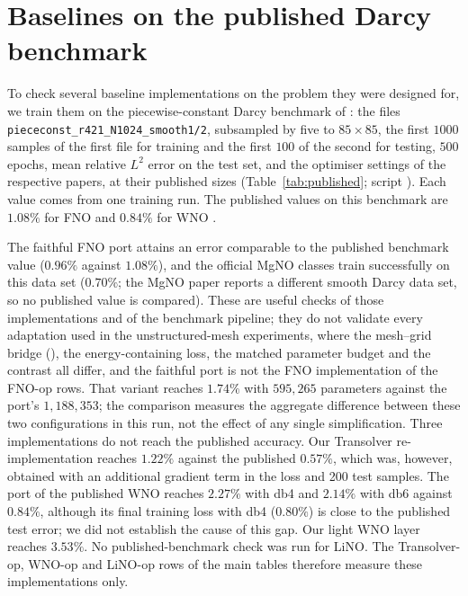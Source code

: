 \section{Baselines on the published Darcy benchmark}\label{app:published}
To check several baseline implementations on the problem they were designed for, we train them on the piecewise-constant
Darcy benchmark of \cite{li2021fno}: the files \texttt{piececonst\_r421\_N1024\_smooth1/2}, subsampled by five to
$85\times85$, the first $1000$ samples of the first file for training and the first $100$ of the second for testing, $500$
epochs, mean relative $L^2$ error on the test set, and the optimiser settings of the respective papers, at their published
sizes (Table~\ref{tab:published}; script ). Each value comes from one training run. The
published values on this benchmark are $1.08\%$ for FNO and $0.84\%$ for WNO \cite{tripura2023wno}.

The faithful FNO port attains an error comparable to the published benchmark value ($0.96\%$ against $1.08\%$), and the
official MgNO classes train successfully on this data set ($0.70\%$; the MgNO paper reports a different smooth Darcy data set, so
no published value is compared). These are useful checks of those implementations and of the benchmark pipeline; they do not
validate every adaptation used in the unstructured-mesh experiments, where the mesh--grid bridge (), the
energy-containing loss, the matched parameter budget and the contrast all differ, and the faithful port is not the FNO
implementation of the FNO-op rows. That variant reaches $1.74\%$ with $595{,}265$ parameters against the port's $1{,}188{,}353$;
the comparison measures the aggregate difference between these two configurations in this run, not the effect of any single
simplification. Three implementations do not reach the published accuracy. Our Transolver re-implementation reaches $1.22\%$
against the published $0.57\%$, which was, however, obtained with an additional gradient term in the loss and 200 test samples.
The port of the published WNO reaches $2.27\%$ with db4 and $2.14\%$ with db6 against $0.84\%$, although its final training loss
with db4 ($0.80\%$) is close to the published test error; we did not establish the cause of this gap. Our light WNO layer reaches
$3.53\%$. No published-benchmark check was run for LiNO. The Transolver-op, WNO-op and LiNO-op rows of the main tables therefore
measure these implementations only.


